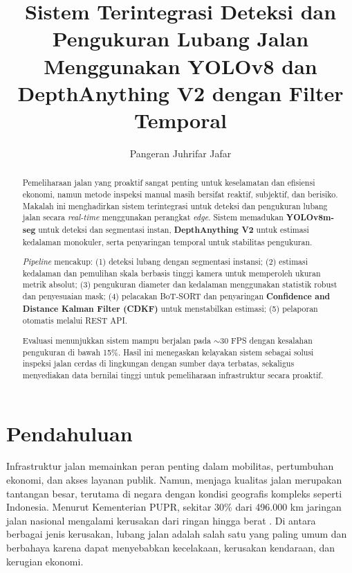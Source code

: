 \documentclass{iopjournal}
\begin{document}

\title{Sistem Terintegrasi Deteksi dan Pengukuran Lubang Jalan Menggunakan YOLOv8 dan DepthAnything V2 dengan Filter Temporal}

\author{Pangeran Juhrifar Jafar}


\begin{abstract}
Pemeliharaan jalan yang proaktif sangat penting untuk keselamatan dan efisiensi ekonomi, namun metode inspeksi manual masih bersifat reaktif, subjektif, dan berisiko. Makalah ini menghadirkan sistem terintegrasi untuk deteksi dan pengukuran lubang jalan secara \textit{real-time} menggunakan perangkat \textit{edge}. Sistem memadukan \textbf{YOLOv8m-seg} untuk deteksi dan segmentasi instan, \textbf{DepthAnything V2} untuk estimasi kedalaman monokuler, serta penyaringan temporal untuk stabilitas pengukuran.

\textit{Pipeline} mencakup: (1) deteksi lubang dengan segmentasi instansi; (2) estimasi kedalaman dan pemulihan skala berbasis tinggi kamera untuk memperoleh ukuran metrik absolut; (3) pengukuran diameter dan kedalaman menggunakan statistik robust dan penyesuaian mask; (4) pelacakan BoT-SORT dan penyaringan \textbf{Confidence and Distance Kalman Filter (CDKF)} untuk menstabilkan estimasi; (5) pelaporan otomatis melalui REST API.

Evaluasi menunjukkan sistem mampu berjalan pada $\sim$30 FPS dengan kesalahan pengukuran di bawah 15\%. Hasil ini menegaskan kelayakan sistem sebagai solusi inspeksi jalan cerdas di lingkungan dengan sumber daya terbatas, sekaligus menyediakan data bernilai tinggi untuk pemeliharaan infrastruktur secara proaktif.
\end{abstract}


\section{Pendahuluan}
\label{sec:introduction}

Infrastruktur jalan memainkan peran penting dalam mobilitas, pertumbuhan ekonomi, dan akses layanan publik. Namun, menjaga kualitas jalan merupakan tantangan besar, terutama di negara dengan kondisi geografis kompleks seperti Indonesia. Menurut Kementerian PUPR, sekitar 30\% dari 496.000 km jaringan jalan nasional mengalami kerusakan dari ringan hingga berat \cite{kemenpupr}. Di antara berbagai jenis kerusakan, lubang jalan adalah salah satu yang paling umum dan berbahaya karena dapat menyebabkan kecelakaan, kerusakan kendaraan, dan kerugian ekonomi.
\end{document}
